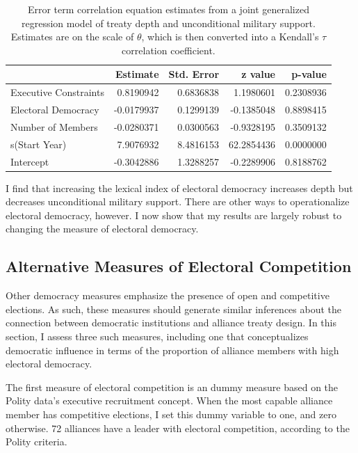 \documentclass[12pt]{article}
\begin{document}
\begin{table}[ht]
\centering
\begin{tabular}{lrrrr}
  \hline
 & Estimate & Std. Error & z value & p-value \\ 
  \hline
  Executive Constraints & 0.8190942 & 0.6836838 & 1.1980601 & 0.2308936 \\ 
  Electoral Democracy & -0.0179937 & 0.1299139 & -0.1385048 & 0.8898415 \\ 
  Number of Members & -0.0280371 & 0.0300563 & -0.9328195 & 0.3509132 \\ 
  s(Start Year) & 7.9076932 & 8.4816153 & 62.2854436 & 0.0000000 \\ 
  Intercept & -0.3042886 & 1.3288257 & -0.2289906 & 0.8188762 \\ 
   \hline
\end{tabular}
\caption{Error term correlation equation estimates from a joint generalized regression model of treaty depth and unconditional military support. 
                    Estimates are on the scale of $\theta$, which is then converted into a Kendall's $\tau$ correlation coefficient. 
                    } 
\label{tab:error-res}
\end{table}


I find that increasing the lexical index of electoral democracy increases depth but decreases unconditional military support. 
There are other ways to operationalize electoral democracy, however. 
I now show that my results are largely robust to changing the measure of electoral democracy. 


\subsection{Alternative Measures of Electoral Competition}


Other democracy measures emphasize the presence of open and competitive elections. 
As such, these measures should generate similar inferences about the connection between democratic institutions and alliance treaty design. 
In this section, I assess three such measures, including one that conceptualizes democratic influence in terms of the proportion of alliance members with high electoral democracy. 


The first measure of electoral competition is an dummy measure based on the Polity data's executive recruitment concept.  
When the most capable alliance member has competitive elections, I set this dummy variable to one, and zero otherwise. 
72 alliances have a leader with electoral competition, according to the Polity criteria. 
\end{document}
